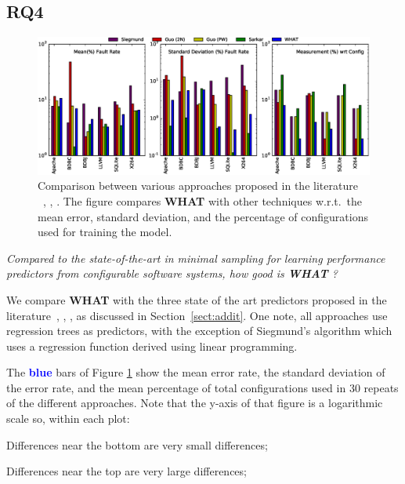 \documentclass{newsig}
\newcommand{\what}{{\bf WHAT }}
\begin{document}
 
\subsection{RQ4}

\begin{figure}[htbp]
\includegraphics[width=\linewidth]{Figures/compare_graph_h.eps}
\caption{Comparison between various approaches proposed in the literature ~\cite{siegmund2012predicting}, \cite{guo2013variability}, \cite{sarkar2015cost}. The figure compares \what with other techniques w.r.t.\ the mean error, standard deviation, and the percentage of configurations used for training the model.} \label{fig:Comparison}
\end{figure}

 \begin{center}
{\em Compared to the state-of-the-art in minimal sampling for learning performance predictors from configurable software systems, how good is \what?}
\end{center}

We compare \what with the three state of the art predictors proposed in the literature~\cite{siegmund2012predicting}, \cite{guo2013variability}, \cite{sarkar2015cost}, as discussed in Section~\ref{sect:addit}. One note, all approaches use regression trees as predictors, with the exception of Siegmund's algorithm which uses a regression function derived using linear programming.
 
 The \textcolor{blue}{\bf blue} bars of Figure \ref{fig:Comparison} show the
 mean error rate, the standard deviation of the error rate, and the mean percentage
 of total configurations used in 30 repeats of the different approaches.
 Note that the y-axis of that figure is a logarithmic scale so, within each plot:
 \begin{compactitem}
 \item Differences near the bottom  are very small differences;
 \item Differences near the top   are very large differences;
 \end{compactitem}
 
\end{document}
